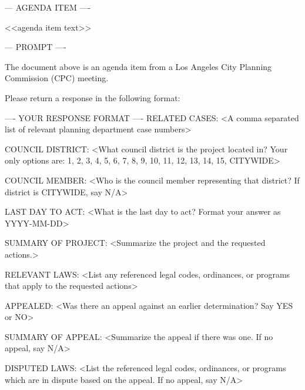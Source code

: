 --- AGENDA ITEM ----

<<agenda item text>>

--- PROMPT ----

The document above is an agenda item from a Los Angeles City Planning Commission (CPC) meeting.

Please return a response in the following format:

---- YOUR RESPONSE FORMAT ----
RELATED CASES:
<A comma separated list of relevant planning department case numbers>

COUNCIL DISTRICT:
<What council district is the project located in? Your only options are: 1, 2, 3, 4, 5, 6, 7, 8, 9, 10, 11, 12, 13, 14, 15, CITYWIDE>

COUNCIL MEMBER:
<Who is the council member representing that district? If district is CITYWIDE, say N/A>

LAST DAY TO ACT:
<What is the last day to act? Format your answer as YYYY-MM-DD>

SUMMARY OF PROJECT:
<Summarize the project and the requested actions.>

RELEVANT LAWS:
<List any referenced legal codes, ordinances, or programs that apply to the requested actions>

APPEALED:
<Was there an appeal against an earlier determination? Say YES or NO>

SUMMARY OF APPEAL:
<Summarize the appeal if there was one. If no appeal, say N/A>

DISPUTED LAWS:
<List the referenced legal codes, ordinances, or programs which are in dispute based on the appeal. If no appeal, say N/A>